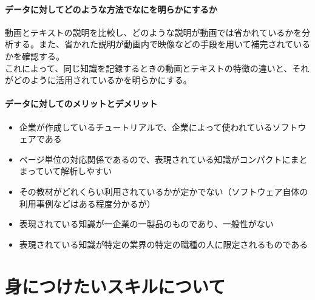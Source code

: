 \hypertarget{ux30c7ux30fcux30bfux306bux5bfeux3057ux3066ux3069ux306eux3088ux3046ux306aux65b9ux6cd5ux3067ux306aux306bux3092ux660eux3089ux304bux306bux3059ux308bux304b-7}{%
\paragraph{データに対してどのような方法でなにを明らかにするか}\label{ux30c7ux30fcux30bfux306bux5bfeux3057ux3066ux3069ux306eux3088ux3046ux306aux65b9ux6cd5ux3067ux306aux306bux3092ux660eux3089ux304bux306bux3059ux308bux304b-7}}

動画とテキストの説明を比較し、どのような説明が動画では省かれているかを分析する。また、省かれた説明が動画内で映像などの手段を用いて補完されているかを確認する。\\
これによって、同じ知識を記録するときの動画とテキストの特徴の違いと、それがどのように活用されているかを明らかにする。

\hypertarget{ux30c7ux30fcux30bfux306bux5bfeux3057ux3066ux306eux30e1ux30eaux30c3ux30c8ux3068ux30c7ux30e1ux30eaux30c3ux30c8-7}{%
\paragraph{データに対してのメリットとデメリット}\label{ux30c7ux30fcux30bfux306bux5bfeux3057ux3066ux306eux30e1ux30eaux30c3ux30c8ux3068ux30c7ux30e1ux30eaux30c3ux30c8-7}}

\begin{itemize}
\tightlist
\item
  企業が作成しているチュートリアルで、企業によって使われているソフトウェアである
\item
  ページ単位の対応関係であるので、表現されている知識がコンパクトにまとまっていて解析しやすい
\item
  その教材がどれくらい利用されているかが定かでない（ソフトウェア自体の利用事例などはある程度分かるが）
\item
  表現されている知識が一企業の一製品のものであり、一般性がない
\item
  表現されている知識が特定の業界の特定の職種の人に限定されるものである
\end{itemize}

\hypertarget{ux8eabux306bux3064ux3051ux305fux3044ux30b9ux30adux30ebux306bux3064ux3044ux3066}{%
\section{身につけたいスキルについて}\label{ux8eabux306bux3064ux3051ux305fux3044ux30b9ux30adux30ebux306bux3064ux3044ux3066}}


